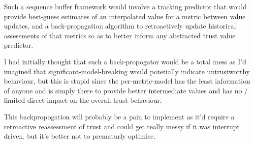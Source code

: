 \documentclass[conference]{IEEEtran}
\begin{document}
Such a sequence buffer framework would involve a tracking predictor that would provide best-guess estimates of an interpolated value for a metric between value updates, and a back-propagation algorithm to retroactively update historical assessments of that metrics so as to better inform any abstracted trust value predictor.

I had initially thought that such a back-propogator would be a total mess as I'd imagined that significant-model-breaking would potetially indicate untrustworthy behaviour, but this is stupid since the per-metric-model has the least information of anyone and is simply there to provide better intermediate values and has no / limited direct impact on the overall trust behaviour. 

This backpropogation will probably be a pain to implement as it'd require a retroactive reassessment of trust and could get really messy if it was interrupt driven, but it's better not to prematurly optimise.


%
%



%
%
\end{document}

